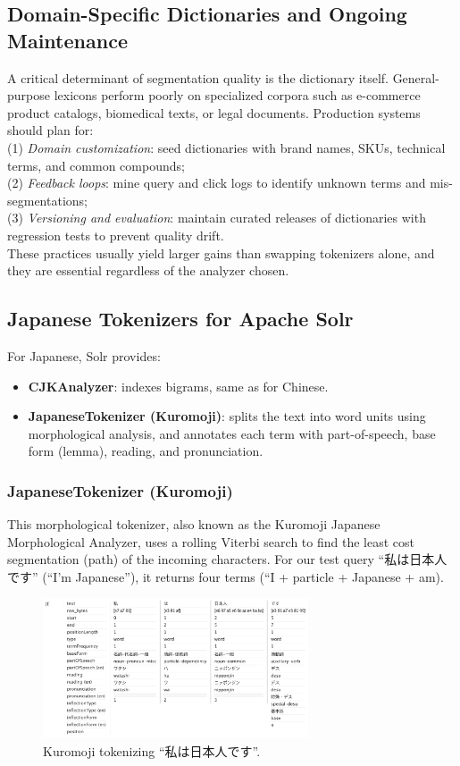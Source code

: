 \documentclass[11pt]{article}
\begin{document}
\subsection{Domain-Specific Dictionaries and Ongoing Maintenance}
A critical determinant of segmentation quality is the dictionary itself. General-purpose lexicons perform poorly on specialized corpora such as e-commerce product catalogs, biomedical texts, or legal documents. Production systems should plan for:\\
(1) \textit{Domain customization}: seed dictionaries with brand names, SKUs, technical terms, and common compounds;\\
(2) \textit{Feedback loops}: mine query and click logs to identify unknown terms and mis-segmentations;\\
(3) \textit{Versioning and evaluation}: maintain curated releases of dictionaries with regression tests to prevent quality drift.\\
These practices usually yield larger gains than swapping tokenizers alone, and they are essential regardless of the analyzer chosen.

\subsection{Japanese Tokenizers for Apache Solr}
For Japanese, Solr provides:
\begin{itemize}
    \item \textbf{CJKAnalyzer}: indexes bigrams, same as for Chinese.
    \item \textbf{JapaneseTokenizer (Kuromoji)}: splits the text into word units using morphological analysis, and annotates each term with part-of-speech, base form (lemma), reading, and pronunciation.
\end{itemize}

\subsubsection{JapaneseTokenizer (Kuromoji)}
This morphological tokenizer, also known as the Kuromoji Japanese Morphological Analyzer, uses a rolling Viterbi search to find the least cost segmentation (path) of the incoming characters. For our test query “私は日本人です” (“I’m Japanese”), it returns four terms (“I + particle + Japanese + am).

\begin{figure}[h!]
    \centering
    \includegraphics[width=0.7\textwidth]{image5.png}
    \caption{Kuromoji tokenizing “私は日本人です”.}
    \label{fig:kuromoji_example1}
\end{figure}
\end{document}
